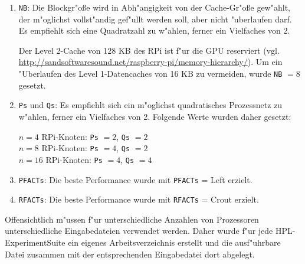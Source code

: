 {\begin{enumerate}
\noindent
$n=4$ RPi-Knoten:\\
Verf"ugbarer Hauptspeicher $=450$ MB$\ast 4=1800$ MB\\
\texttt{N} $=30\ast 96=2880$ (empirisch ermittelt)

$n=8$ RPi-Knoten:\\
Verf"ugbarer Hauptspeicher $=450$ MB$\ast 8=3600$ MB\\
\texttt{N} $=\sqrt{4608\ast 3600}\approx 4073\Rightarrow$ setze \texttt{N} $=42\ast 96=4032$

$n=16$ RPi-Knoten:\\
Verf"ugbarer Hauptspeicher $=450$ MB$\ast 16=7200$ MB\\
\texttt{N} $=\sqrt{4608\ast 7200}=5760\Rightarrow$ setze \texttt{N} $=60\ast 96=5760$	
	\item \texttt{NB}: Die Blockgr"o\ss e wird in Abh"angigkeit von der Cache-Gr"o\ss e gew"ahlt, der m"oglichst vollst"andig gef"ullt werden soll, aber nicht "uberlaufen darf. Es empfiehlt sich eine Quadratzahl zu w"ahlen, ferner ein Vielfaches von 2. 

Der Level 2-Cache von 128 KB des RPi ist f"ur die GPU reserviert (vgl. \url{http://sandsoftwaresound.net/raspberry-pi/memory-hierarchy/}). Um ein "Uberlaufen des Level 1-Datencaches von 16 KB zu vermeiden, wurde \texttt{NB} $= 8$ gesetzt. 
	\item \texttt{Ps} und \texttt{Qs}: Es empfiehlt sich ein m"oglichst quadratisches Prozessnetz zu w"ahlen, ferner ein Vielfaches von 2. Folgende Werte wurden daher gesetzt: 
	
$n=4$ RPi-Knoten: \texttt{Ps} $=2$, \texttt{Qs} $=2$\\ 
$n=8$ RPi-Knoten: \texttt{Ps} $=4$, \texttt{Qs} $=2$\\ 
$n=16$ RPi-Knoten: \texttt{Ps} $=4$, \texttt{Qs} $=4$
	\item \texttt{PFACTs}: Die beste Performance wurde mit \texttt{PFACTs} = Left erzielt. 
	\item \texttt{RFACTs}: Die beste Performance wurde mit \texttt{RFACTs} = Crout erzielt.
\end{enumerate}
Offensichtlich m"ussen f"ur unterschiedliche Anzahlen von Prozessoren unterschiedliche Eingabedateien verwendet werden. Daher wurde f"ur jede HPL-ExperimentSuite ein eigenes Arbeitsverzeichnis erstellt und die ausf"uhrbare Datei zusammen mit der entsprechenden Eingabedatei dort abgelegt. 

}
